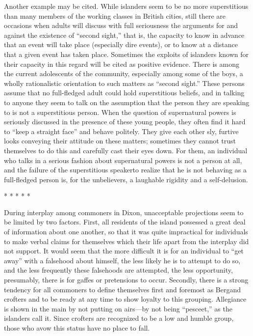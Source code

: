 \documentclass[openany,nobib]{tufte-book}
\begin{document}
Another example may be cited. While islanders seem to be no more
superstitious than many members of the working classes in British
cities, still there are occasions when adults will discuss with full
seriousness the arguments for and against the existence of ``second
sight,'' that is, the capacity to know in advance that an event will
take place (especially dire events), or to know at a distance that a
given event has taken place. Sometimes the exploits of islanders known
for their capacity in this regard will be cited as positive evidence.
There is among the current adolescents of the community, especially
among some of the boys, a wholly rationalistic orientation to such
matters as ``second sight.'' These persons assume that no full-fledged
adult could hold superstitious beliefs, and in talking to anyone they
seem to talk on the assumption that the person they are speaking to is
not a superstitious person. When the question of supernatural powers is
seriously discussed in the presence of these young people, they often
find it hard to ``keep a straight face'' and behave politely. They give
each other sly, furtive looks conveying their attitude on these matters;
sometimes they cannot trust themselves to do this and carefully cast
their eyes down. For them, an individual who talks in a serious fashion
about supernatural powers is not a person at all, and the failure of the
superstitious speaker\newpage\noindent to realize that he is not behaving as a
full-fledged person is, for the unbelievers, a laughable rigidity and a
self-delusion.

\vspace{.2in}
\begin{centering}

\Large{* * * * *}

\end{centering}
\vspace{.17in}

\noindent During interplay among commoners in Dixon, unacceptable projections seem
to be limited by two factors. First, all residents of the island
possessed a great deal of information about one another, so that it was
quite impractical for individuals to make verbal claims for themselves
which their life apart from the interplay did not support. It would seem
that the more difficult it is for an individual to ``get away'' with a
falsehood about himself, the less likely he is to attempt to do so, and
the less frequently these falsehoods are attempted, the less
opportunity, presumably, there is for gaffes or pretensions to occur.
Secondly, there is a strong tendency for all commoners to define
themselves first and foremost as Bergand crofters and to be ready at any
time to show loyalty to this grouping. Allegiance is shown in the main
by not putting on airs---by not being ``pesceet,'' as the islanders call
it. Since crofters are recognized to be a low and humble group, those
who avow this status have no place to fall.
\end{document}
